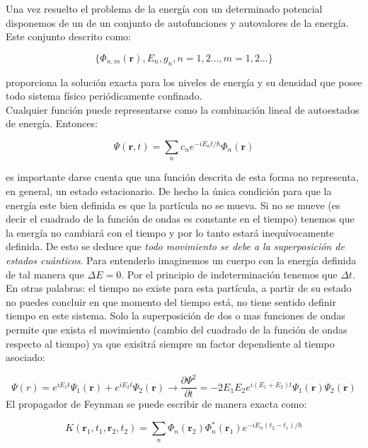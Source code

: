 \documentclass[12pt,a4paper]{article}
\numberwithin{equation}{section}
\numberwithin{figure}{section}
\newcommand{\parciales}[2]{\frac{\partial #1}{\partial #2}}
\newcommand{\rn}{\mathbf{r}}
\begin{document}
 Una vez resuelto el problema de la energía con un determinado potencial disponemos de un de un conjunto de autofunciones y autovalores de la energía. Este conjunto descrito como:

\begin{equation}
\lbrace \Phi_{n,m} (\rn), E_n,g_n,n=1,2...,m=1,2... \rbrace
\end{equation}

proporciona la solución exacta para los niveles de energía y su densidad que posee todo sistema físico periódicamente confinado. \\

Cualquier función puede representarse como la combinación lineal de autoestados de energía. Entonces:

\begin{equation}
\Psi (\rn,t) = \sum_n c_n e^{-i E_nt/\hbar} \Phi_n(\rn)
\end{equation}

es importante darse cuenta que una función descrita de esta forma no representa, en general, un estado estacionario. De hecho la única condición para que la energía este bien definida es que la partícula no se mueva. Si no se mueve (es decir el cuadrado de la función de ondas es constante en el tiempo) tenemos que la energía no cambiará con el tiempo y por lo tanto estará inequívocamente definida. De esto se deduce que \textit{todo movimiento se debe a la superposición de estados cuánticos}. Para entenderlo imaginemos un cuerpo con la energía definida de tal manera que $\Delta E = 0$. Por el principio de indeterminación tenemos que $\Delta t$. En otras palabras: el tiempo no existe para esta partícula, a partir de su estado no puedes concluir en que momento del tiempo está, no tiene sentido definir tiempo en este sistema. Solo la superposición de dos o mas funciones de ondas permite que exista el movimiento (cambio del cuadrado de la función de ondas respecto al tiempo) ya que exisitrá siempre un factor dependiente al tiempo asociado:

\begin{equation}
\Psi (r) = e^{i E_1 t} \Psi_1(\rn) + e^{i E_2 t}\Psi_2 (\rn)  \longrightarrow \parciales{ \Psi^{2}}{t} =  -2 E_1 E_2 e^{i (E_1 + E_2) t} \Psi_1 (\rn) \Psi_2 (\rn)
\end{equation}
El propagador de Feynman se puede escribir de manera exacta como:

\begin{equation}
K(\rn_1,t_1,\rn_2,t_2) = \sum_n \Phi_n (\rn_2) \Phi_n^* (\rn_1) e^{-i E_n (t_2-t_1)/\hbar}
\end{equation}
\end{document}
